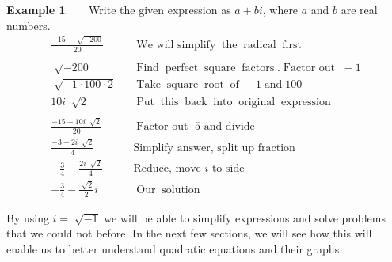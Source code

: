 \documentclass[12pt]{book}
\theoremstyle{definition}
\newtheorem{example}{Example}
\newcommand{\tmop}[1]{\ensuremath{\operatorname{#1}}}
\begin{document}
\begin{example}~~~Write the given expression as $a+bi$, where $a$ and $b$ are real numbers.
  \begin{eqnarray*}
    \frac{- 15 - \sqrt[]{- 200}}{20} &  & \tmop{We~will~simplify} \tmop{the}
    \tmop{radical} \tmop{first}\\
		& &\\
    \sqrt[]{- 200} &  & \tmop{Find} \tmop{perfect} \tmop{square}
    \tmop{factors}. \tmop{Factor~out~} - 1\\
    \sqrt[]{- 1 \cdot 100 \cdot 2} &  & \tmop{Take} \tmop{square} \tmop{root}
    \tmop{of} - 1 \tmop{and} 100\\
    10 i ~\sqrt[]{2} &  & \tmop{Put} \tmop{this} \tmop{back} \tmop{into}
    \tmop{original} \tmop{expression}\\
    & &\\
		\frac{- 15 - 10 i ~\sqrt[]{2}}{20} &  & \tmop{Factor~out~} 5 \text{~and~divide}\\
    \frac{- 3 - 2 i ~\sqrt[]{2}}{4}& & \text{Simplify answer, split up fraction}\\
		-\frac{3}{4}-\frac{2 i ~\sqrt[]{2}}{4} & & \text{Reduce, move~} i\text{~to side}\\
		-\frac{3}{4}-\frac{\sqrt[]{2}}{2}i &  & \tmop{Our} \tmop{solution}
  \end{eqnarray*}
\end{example}
By using $i = \sqrt[]{- 1}$ we will be able to simplify expressions and solve problems that we could not before. In the next few sections, we will see how this will enable us to better understand quadratic equations and their graphs.
\end{document}
